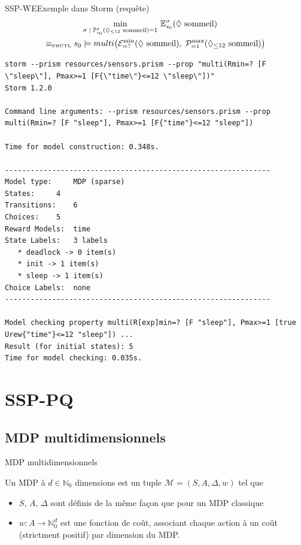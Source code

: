 \documentclass[compress]{beamer}
\theoremstyle{theorem}%
\begin{document}
\begin{frame}[fragile]{SSP-WE}{Exemple dans Storm (requête)}
    \vspace{-0.05\linewidth}
    \footnotesize
    \begin{align*}
    &\min_{\sigma \; | \;  \mathbb{P}^\sigma_{s_0}(\Diamond_{\leq 12} \text{ sommeil}) = 1} \, \mathbb{E}^{\sigma}_{s_0}(\Diamond \text{ sommeil}) \\
      \equiv_{\text{\tiny PRCTL}}s_0 & \models multi\big( \mathcal{E}^{\min}_{=?} (\Diamond \text{ sommeil}), \; \mathcal{P}^{\max}_{=1} (\Diamond_{\leq 12} \text{ sommeil})\big)
    \end{align*}
  {\fontsize{4}{5}
  \begin{verbatim}
storm --prism resources/sensors.prism --prop "multi(Rmin=? [F \"sleep\"], Pmax>=1 [F{\"time\"}<=12 \"sleep\"])"
Storm 1.2.0

Command line arguments: --prism resources/sensors.prism --prop multi(Rmin=? [F "sleep"], Pmax>=1 [F{"time"}<=12 "sleep"])

Time for model construction: 0.348s.

--------------------------------------------------------------
Model type: 	MDP (sparse)
States: 	4
Transitions: 	6
Choices: 	5
Reward Models:  time
State Labels: 	3 labels
   * deadlock -> 0 item(s)
   * init -> 1 item(s)
   * sleep -> 1 item(s)
Choice Labels: 	none
--------------------------------------------------------------

Model checking property multi(R[exp]min=? [F "sleep"], Pmax>=1 [true Urew{"time"}<=12 "sleep"]) ...
Result (for initial states): 5
Time for model checking: 0.035s.
  \end{verbatim}
  }
\end{frame}

\section{SSP-PQ}
\subsection{MDP multidimensionnels}
\begin{frame}{MDP multidimensionnels}
  \begin{definition}
    Un MDP à $d \in \mathbb{N}_0$ dimensions est un tuple $\mathcal{M} = (S, A, \Delta, w)$ tel que
    \begin{itemize}
      \item $S$, $A$, $\Delta$ sont définis de la même façon que pour un MDP classique
      \item $w : A \rightarrow \mathbb{N}_0^d$ est une fonction de coût, associant chaque action à un coût (strictment positif) par dimension du MDP.
    \end{itemize}
  \end{definition}
\end{frame}
\end{document}
